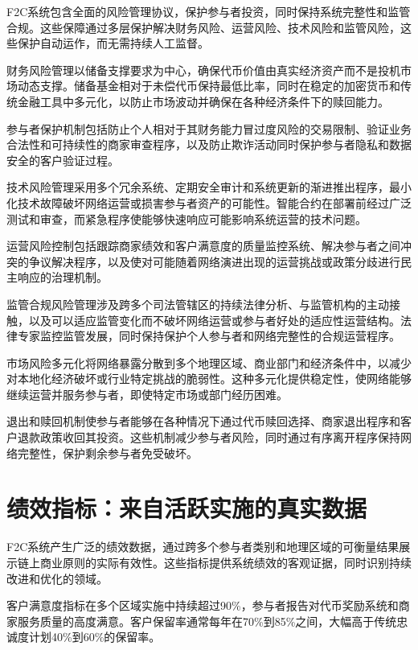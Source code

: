 \documentclass[
  Letterpaper,
]{scrbook}
\begin{document}
F2C系统包含全面的风险管理协议，保护参与者投资，同时保持系统完整性和监管合规。这些保障通过多层保护解决财务风险、运营风险、技术风险和监管风险，这些保护自动运作，而无需持续人工监督。

财务风险管理以储备支撑要求为中心，确保代币价值由真实经济资产而不是投机市场动态支撑。储备基金相对于未偿代币保持最低比率，同时在稳定的加密货币和传统金融工具中多元化，以防止市场波动并确保在各种经济条件下的赎回能力。

参与者保护机制包括防止个人相对于其财务能力冒过度风险的交易限制、验证业务合法性和可持续性的商家审查程序，以及防止欺诈活动同时保护参与者隐私和数据安全的客户验证过程。

技术风险管理采用多个冗余系统、定期安全审计和系统更新的渐进推出程序，最小化技术故障破坏网络运营或损害参与者资产的可能性。智能合约在部署前经过广泛测试和审查，而紧急程序使能够快速响应可能影响系统运营的技术问题。

运营风险控制包括跟踪商家绩效和客户满意度的质量监控系统、解决参与者之间冲突的争议解决程序，以及使对可能随着网络演进出现的运营挑战或政策分歧进行民主响应的治理机制。

监管合规风险管理涉及跨多个司法管辖区的持续法律分析、与监管机构的主动接触，以及可以适应监管变化而不破坏网络运营或参与者好处的适应性运营结构。法律专家监控监管发展，同时保持保护个人参与者和网络完整性的合规运营程序。

市场风险多元化将网络暴露分散到多个地理区域、商业部门和经济条件中，以减少对本地化经济破坏或行业特定挑战的脆弱性。这种多元化提供稳定性，使网络能够继续运营并服务参与者，即使特定市场或部门经历困难。

退出和赎回机制使参与者能够在各种情况下通过代币赎回选择、商家退出程序和客户退款政策收回其投资。这些机制减少参与者风险，同时通过有序离开程序保持网络完整性，保护剩余参与者免受破坏。

\section{绩效指标：来自活跃实施的真实数据}\label{ux7ee9ux6548ux6307ux6807ux6765ux81eaux6d3bux8dc3ux5b9eux65bdux7684ux771fux5b9eux6570ux636e}

F2C系统产生广泛的绩效数据，通过跨多个参与者类别和地理区域的可衡量结果展示链上商业原则的实际有效性。这些指标提供系统绩效的客观证据，同时识别持续改进和优化的领域。

客户满意度指标在多个区域实施中持续超过90\%，参与者报告对代币奖励系统和商家服务质量的高度满意。客户保留率通常每年在70\%到85\%之间，大幅高于传统忠诚度计划40\%到60\%的保留率。
\end{document}
